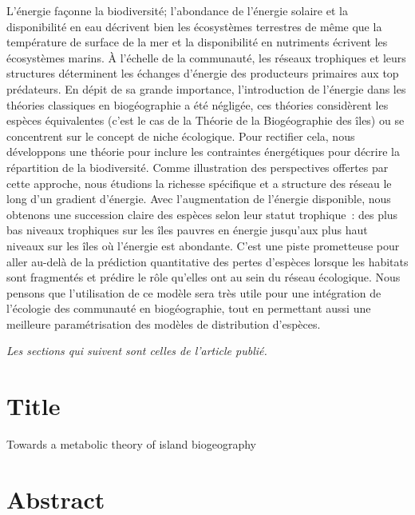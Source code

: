 L’énergie façonne la biodiversité; l’abondance de l’énergie solaire et la
disponibilité en eau décrivent bien les écosystèmes terrestres de même que la
température de surface de la mer et la disponibilité en nutriments écrivent les
écosystèmes marins. À l'échelle de la communauté, les réseaux trophiques et
leurs structures déterminent les échanges d'énergie des producteurs primaires
aux top prédateurs. En dépit de sa grande importance, l'introduction de
l'énergie dans les théories classiques en biogéographie a été négligée, ces
théories considèrent les espèces équivalentes (c'est le cas de la Théorie de la
Biogéographie des îles) ou se concentrent sur le concept de niche
écologique. Pour rectifier cela, nous développons une théorie pour inclure
les contraintes énergétiques pour décrire la répartition de la biodiversité.
Comme illustration des perspectives offertes par cette approche, nous étudions
la richesse spécifique et a structure des réseau le long d'un gradient
d'énergie. Avec l'augmentation de l'énergie disponible, nous obtenons une succession claire
des espèces selon leur statut trophique~: des plus bas niveaux trophiques sur
les îles pauvres en énergie jusqu'aux plus haut niveaux sur les îles où l'énergie
est abondante. C'est une piste prometteuse pour aller au-delà de la prédiction quantitative
des pertes d’espèces lorsque les habitats sont fragmentés et prédire le rôle qu'elles
ont au sein du réseau écologique. Nous pensons que l'utilisation de ce modèle
sera très utile pour une intégration de l'écologie des communauté en biogéographie,
tout en permettant aussi une meilleure paramétrisation des modèles de distribution
d'espèces.




\emph{Les sections qui suivent sont celles de l'article publié.}
\section{Title}\label{title}

Towards a metabolic theory of island biogeography


\section{Abstract}\label{abstract}

